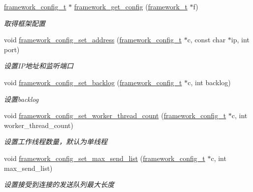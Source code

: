 \begin{DoxyCompactItemize}
\hyperlink{a00047_a55b26efa9e6ee05514d087ba2593a54b_a55b26efa9e6ee05514d087ba2593a54b}{framework\+\_\+config\+\_\+t} $\ast$ \hyperlink{a00093_gaf0524cc257c8e57ba11d676dcca6bf64_gaf0524cc257c8e57ba11d676dcca6bf64}{framework\+\_\+get\+\_\+config} (\hyperlink{a00047_a6149d769f6f07ed14a40a271c95d8463_a6149d769f6f07ed14a40a271c95d8463}{framework\+\_\+t} $\ast$f)
\begin{DoxyCompactList}\small\item\em 取得框架配置 \end{DoxyCompactList}\item 
void \hyperlink{a00093_ga63620720efce87c837a3f069f626f6b1_ga63620720efce87c837a3f069f626f6b1}{framework\+\_\+config\+\_\+set\+\_\+address} (\hyperlink{a00047_a55b26efa9e6ee05514d087ba2593a54b_a55b26efa9e6ee05514d087ba2593a54b}{framework\+\_\+config\+\_\+t} $\ast$c, const char $\ast$ip, int port)
\begin{DoxyCompactList}\small\item\em 设置\+I\+P地址和监听端口 \end{DoxyCompactList}\item 
void \hyperlink{a00093_gafdcba98785a6e0c7729c14eac004c1e3_gafdcba98785a6e0c7729c14eac004c1e3}{framework\+\_\+config\+\_\+set\+\_\+backlog} (\hyperlink{a00047_a55b26efa9e6ee05514d087ba2593a54b_a55b26efa9e6ee05514d087ba2593a54b}{framework\+\_\+config\+\_\+t} $\ast$c, int backlog)
\begin{DoxyCompactList}\small\item\em 设置backlog \end{DoxyCompactList}\item 
void \hyperlink{a00093_ga46fc5d54c72138bced5ddd4068ef77e5_ga46fc5d54c72138bced5ddd4068ef77e5}{framework\+\_\+config\+\_\+set\+\_\+worker\+\_\+thread\+\_\+count} (\hyperlink{a00047_a55b26efa9e6ee05514d087ba2593a54b_a55b26efa9e6ee05514d087ba2593a54b}{framework\+\_\+config\+\_\+t} $\ast$c, int worker\+\_\+thread\+\_\+count)
\begin{DoxyCompactList}\small\item\em 设置工作线程数量，默认为单线程 \end{DoxyCompactList}\item 
void \hyperlink{a00093_ga6d3affd6639a3d75920197811c333fac_ga6d3affd6639a3d75920197811c333fac}{framework\+\_\+config\+\_\+set\+\_\+max\+\_\+send\+\_\+list} (\hyperlink{a00047_a55b26efa9e6ee05514d087ba2593a54b_a55b26efa9e6ee05514d087ba2593a54b}{framework\+\_\+config\+\_\+t} $\ast$c, int max\+\_\+send\+\_\+list)
\begin{DoxyCompactList}\small\item\em 设置接受到连接的发送队列最大长度 \end{DoxyCompactList}\item 

\end{DoxyCompactItemize}

